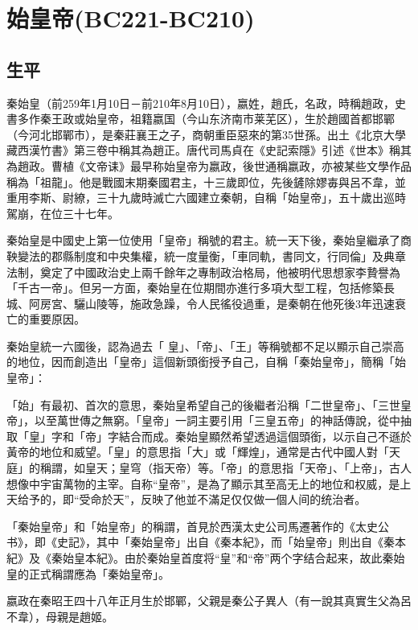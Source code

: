 
\section{始皇帝\tiny(BC221-BC210)}

\subsection{生平}


秦始皇（前259年1月10日－前210年8月10日），嬴姓，趙氏，名政，時稱趙政，史書多作秦王政或始皇帝，祖籍嬴国（今山东济南市莱芜区），生於趙國首都邯鄲（今河北邯鄲市），是秦莊襄王之子，商朝重臣惡來的第35世孫。出土《北京大學藏西漢竹書》第三卷中稱其為趙正。唐代司馬貞在《史記索隱》引述《世本》稱其為趙政。曹植《文帝诔》最早称始皇帝为嬴政，後世通稱嬴政，亦被某些文學作品稱為「祖龍」。他是戰國末期秦國君主，十三歲即位，先後鏟除嫪毐與呂不韋，並重用李斯、尉繚，三十九歲時滅亡六國建立秦朝，自稱「始皇帝」，五十歲出巡時駕崩，在位三十七年。

秦始皇是中國史上第一位使用「皇帝」稱號的君主。統一天下後，秦始皇繼承了商鞅變法的郡縣制度和中央集權，統一度量衡，「車同軌，書同文，行同倫」及典章法制，奠定了中國政治史上兩千餘年之專制政治格局，他被明代思想家李贄譽為「千古一帝」。但另一方面，秦始皇在位期間亦進行多項大型工程，包括修築長城、阿房宮、驪山陵等，施政急躁，令人民徭役過重，是秦朝在他死後3年迅速衰亡的重要原因。

秦始皇統一六國後，認為過去「 皇」、「帝」、「王」等稱號都不足以顯示自己崇高的地位，因而創造出「皇帝」這個新頭銜授予自己，自稱「秦始皇帝」，簡稱「始皇帝」：

「始」有最初、首次的意思，秦始皇希望自己的後繼者沿稱「二世皇帝」、「三世皇帝」，以至萬世傳之無窮。「皇帝」一詞主要引用「三皇五帝」的神話傳說，從中抽取「皇」字和「帝」字結合而成。秦始皇顯然希望透過這個頭銜，以示自己不遜於黃帝的地位和威望。「皇」的意思指「大」或「輝煌」，通常是古代中國人對「天庭」的稱謂，如皇天；皇穹（指天帝）等。「帝」的意思指「天帝」、「上帝」，古人想像中宇宙萬物的主宰。自称“皇帝”，是為了顯示其至高无上的地位和权威，是上天给予的，即“受命於天”，反映了他並不滿足仅仅做一個人间的统治者。

「秦始皇帝」和「始皇帝」的稱謂，首見於西漢太史公司馬遷著作的《太史公书》，即《史記》，其中「秦始皇帝」出自《秦本紀》，而「始皇帝」則出自《秦本紀》及《秦始皇本紀》。由於秦始皇首度将“皇”和“帝”两个字结合起来，故此秦始皇的正式稱謂應為「秦始皇帝」。

嬴政在秦昭王四十八年正月生於邯鄲，父親是秦公子異人（有一說其真實生父為呂不韋），母親是趙姬。

